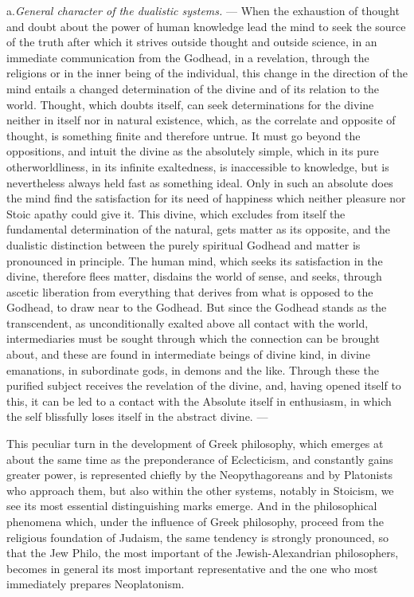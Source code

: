 a.\enspace \emph{General character of the dualistic systems.} --- When the exhaustion of thought and doubt about the power of
human knowledge lead the mind to seek the source of the truth after which it strives outside thought
and outside science, in an immediate communication from the Godhead, in a revelation, through the religions or in the inner being of the individual, this change in the direction of the mind entails a changed determination of the divine and of
its relation to the world. Thought, which doubts itself, can
seek determinations for the divine neither in itself nor in natural existence, which, as
the correlate and opposite of thought, is something finite and therefore
untrue. It must
go beyond the oppositions, and intuit the divine
as the absolutely simple, which in its pure otherworldliness, in its
infinite exaltedness, is inaccessible to knowledge, but
is nevertheless always held fast as something ideal. Only in such an absolute
does the mind find the satisfaction for its need of happiness which neither pleasure nor Stoic apathy could give
it. This divine, which excludes from itself the fundamental determination of the natural, gets matter as its opposite,
and the dualistic distinction between the purely spiritual Godhead and matter is pronounced in principle. The human mind, which
seeks its satisfaction in the divine, therefore flees matter, disdains the world of sense, and seeks, through ascetic
liberation from everything that derives from what is opposed to the Godhead,
to draw near to the Godhead. But since the Godhead stands
as the transcendent, as unconditionally exalted above all contact with the world, intermediaries must be sought through which
the connection can be brought about, and these are found in intermediate beings
of divine kind, in divine emanations, in subordinate gods, in demons and the like. Through these the purified subject receives the revelation of the divine, and, having
opened itself to this, it can be led to a contact with
the Absolute itself in enthusiasm, in which the self blissfully loses itself in the abstract divine. ---

This peculiar turn in the development of Greek philosophy,
which emerges at about the same time as the preponderance of Eclecticism, and constantly gains greater power, is represented
chiefly by the Neopythagoreans and by Platonists who approach
them, but also within the other systems, notably in
Stoicism, we see its most essential distinguishing marks emerge.
And in the philosophical phenomena which, under the influence of Greek
philosophy, proceed from the religious foundation of Judaism, the same tendency is strongly pronounced, so that
the Jew Philo, the most important of the Jewish-Alexandrian philosophers, becomes in general its most important representative and
the one who most immediately prepares Neoplatonism.

